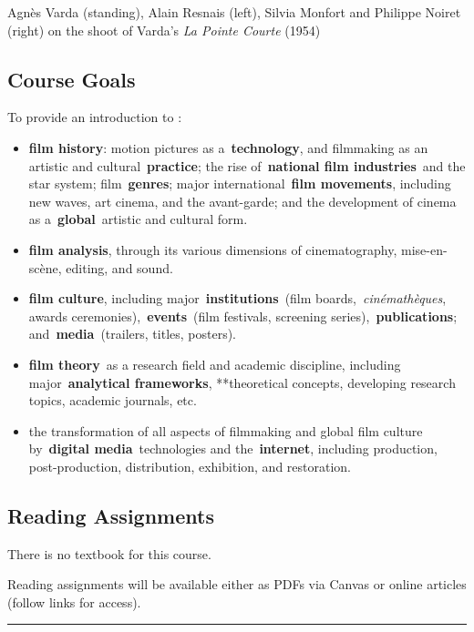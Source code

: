 \documentclass[
  letterpaper,
  DIV=11,
  numbers=noendperiod,
  oneside]{scrartcl}
\providecommand{\tightlist}{%
  \setlength{\itemsep}{0pt}\setlength{\parskip}{0pt}}
\begin{document}
Agnès Varda (standing), Alain Resnais (left), Silvia Monfort and
Philippe Noiret (right) on the shoot of Varda's \emph{La Pointe Courte}
(1954)

\subsection{Course Goals}\label{course-goals}

To provide an introduction to :

\begin{itemize}
\tightlist
\item
  \textbf{film history}: motion pictures as a~\textbf{technology}, and
  filmmaking as an artistic and cultural~\textbf{practice}; the rise
  of~\textbf{national film industries}~and the star system;
  film~\textbf{genres}; major international~\textbf{film movements},
  including new waves, art cinema, and the avant-garde; and the
  development of cinema as a~\textbf{global}~artistic and cultural form.
\item
  \textbf{film analysis}, through its various dimensions of
  cinematography, mise-en-scène, editing, and sound.
\item
  \textbf{film culture}, including major~\textbf{institutions}~(film
  boards,~\emph{cinémathèques}, awards
  ceremonies),~\textbf{events}~(film festivals, screening
  series),~\textbf{publications}; and~\textbf{media}~(trailers, titles,
  posters).
\item
  \textbf{film theory}~as a research field and academic discipline,
  including major~\textbf{analytical frameworks}, **theoretical
  concepts, developing research topics, academic journals, etc.
\item
  the transformation of all aspects of filmmaking and global film
  culture by~\textbf{digital media}~technologies and
  the~\textbf{internet}, including production, post-production,
  distribution, exhibition, and restoration.
\end{itemize}

\subsection{Reading Assignments}\label{reading-assignments}

There is no textbook for this course.

Reading assignments will be available either as PDFs via Canvas or
online articles (follow links for access).

\begin{center}\rule{0.5\linewidth}{0.5pt}\end{center}
\end{document}
